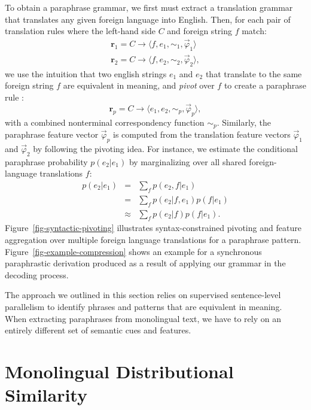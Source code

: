 \documentclass[11pt]{article}
\begin{document}
To obtain a paraphrase grammar, we first must extract a translation
grammar that translates any given foreign language into English. Then,
for each pair of translation rules where the left-hand side $C$ and
foreign string $f$ match:
\begin{eqnarray*}
    \mathbf{r}_1 = C \rightarrow \langle f, e_1, \sim_1, \vec{\varphi}_1
  \rangle \phantom{,} \\
  \mathbf{r}_2 = C \rightarrow \langle f, e_2, \sim_2, \vec{\varphi}_2
  \rangle ,
\end{eqnarray*}
we use the intuition that two english strings $e_1$ and $e_2$ that
translate to the same foreign string $f$ are equivalent in meaning,
and \emph{pivot} over $f$ to create a paraphrase rule
\cite{Ganitkevitch2011,Callison-Burch2008,Callison-Burch2005}:
\begin{equation*}
  \mathbf{r}_p = C \rightarrow \langle e_1, e_2, \sim_p, \vec{\varphi}_p \rangle ,
\end{equation*}
with a combined nonterminal correspondency function $\sim_p$.
Similarly, the paraphrase feature vector $\vec{\varphi}_p$ is computed
from the translation feature vectors $\vec{\varphi}_1$ and
$\vec{\varphi}_2$ by following the pivoting idea. For instance, we
estimate the conditional paraphrase probability $p(e_2 | e_1)$ by
marginalizing over all shared foreign-language translations $f$:
\begin{eqnarray}
  p(e_2|e_1) &=& \sum_f p(e_2,f|e_1)\\
  &=& \sum_f p(e_2|f,e_1) p(f|e_1) \\
  &\approx& \sum_f p(e_2|f) p(f|e_1) .
\label{eq-paraphrase-probability}
\end{eqnarray}
Figure~\ref{fig-syntactic-pivoting} illustrates syntax-constrained
pivoting and feature aggregation over multiple foreign language
translations for a paraphrase pattern.
Figure~\ref{fig-example-compression} shows an example for a
synchronous paraphrastic derivation produced as a result of applying
our grammar in the decoding process.

The approach we outlined in this section relies on supervised
sentence-level parallelism to identify phrases and patterns that are
equivalent in meaning. When extracting paraphrases from monolingual
text, we have to rely on an entirely different set of semantic cues
and features.

\section{Monolingual Distributional Similarity}
\label{sec-mds}
\end{document}
